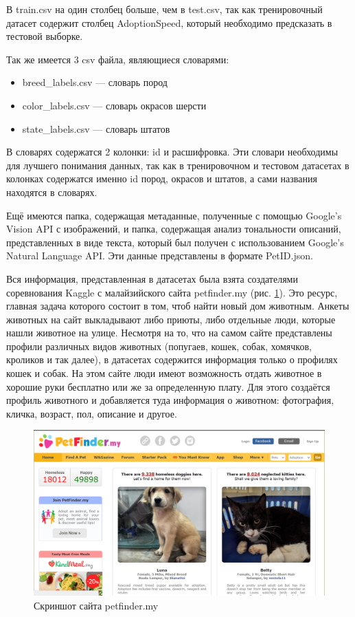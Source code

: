 \documentclass[14pt]{mmcs_article}
\begin{document}
В train.csv на один столбец больше, чем в test.csv, так как тренировочный датасет содержит столбец AdoptionSpeed, который необходимо предсказать в тестовой выборке.

Так же имеется 3 csv файла, являющиеся словарями:

\begin{itemize}
	\item breed\_labels.csv --- словарь пород
	\item color\_labels.csv --- словарь окрасов шерсти
	\item state\_labels.csv --- словарь штатов
\end{itemize}

В словарях содержатся 2 колонки: id и расшифровка. Эти словари необходимы для лучшего понимания данных, так как в тренировочном и тестовом датасетах в колонках содержатся именно id пород, окрасов и штатов, а сами названия находятся в словарях.

Ещё имеются папка, содержащая метаданные, полученные с помощью Google’s Vision API с изображений, и папка, содержащая анализ тональности описаний, представленных в виде текста, который был получен с использованием Google’s Natural Language API. Эти данные представлены в формате PetID.json.

Вся информация, представленная в датасетах была взята создателями соревнования Kaggle с малайзийского сайта petfinder.my (рис. \ref{analyse:petfinder}). Это ресурс, главная задача которого состоит в том, чтоб найти новый дом животным. Анкеты животных на сайт выкладывают либо приюты, либо отдельные люди, которые нашли животное на улице. Несмотря на то, что на самом сайте представлены профили различных видов животных (попугаев, кошек, собак, хомячков, кроликов и так далее), в датасетах содержится информация только о профилях кошек и собак. На этом сайте люди имеют возможность отдать животное в хорошие руки бесплатно или же за определенную плату. Для этого создаётся профиль животного и добавляется туда информация о животном: фотография, кличка, возраст, пол, описание и другое.

\begin{figure}[H]
	\centering
	\includegraphics[scale=0.4]{petfinder.png}
	\caption{Скриншот сайта petfinder.my}\label{analyse:petfinder}
\end{figure}
\end{document}
